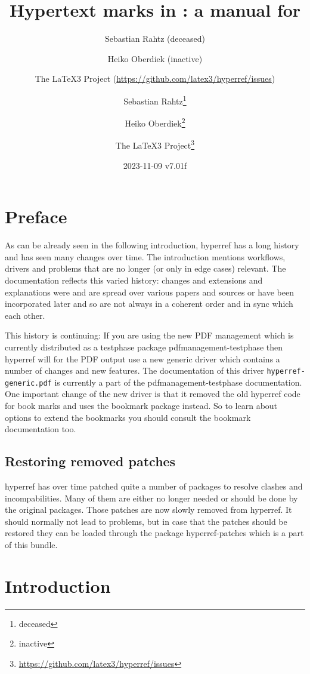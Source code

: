 \documentclass{article}
\author{Sebastian Rahtz (deceased)\and
       Heiko Oberdiek (inactive)\and
       The \LaTeX3 Project (\url{https://github.com/latex3/hyperref/issues})}
\author{Sebastian Rahtz\thanks{deceased}\and
       Heiko Oberdiek\thanks{inactive}\and
       The \LaTeX3 Project\thanks{\url{https://github.com/latex3/hyperref/issues}}}
\title{Hypertext marks in \hologo{LaTeX}: a manual for \xpackage{hyperref}}
\date{2023-11-09 v7.01f}
\newcommand*{\xpackage}[1]{\textsf{#1}}
\begin{document}
\thispagestyle{empty}
\maketitle
\tableofcontents
\setcounter{tocdepth}{2}%

\section{Preface}
As can be already seen in the following introduction, \xpackage{hyperref}
has a long history and has seen many changes over time. The introduction
mentions workflows, drivers and problems that are no longer (or only in edge cases) relevant.
The documentation reflects this varied history: changes
and extensions and explanations were and are spread over various papers and sources or
have been incorporated later and so are not always in a coherent order and in sync which each other.

This history is continuing: If you are using the new  PDF management
which is currently distributed as a testphase package \xpackage{pdfmanagement-testphase}
then \xpackage{hyperref} will for the PDF output use a new generic driver which
contains a number of changes and new features. The documentation of this driver
\texttt{hyperref-generic.pdf}
is currently a part of the \xpackage{pdfmanagement-testphase} documentation.
One important change of the new driver is
that it removed the old \xpackage{hyperref} code for book marks and uses
the \xpackage{bookmark} package instead. So to learn
about options to extend the bookmarks you should consult the \xpackage{bookmark} documentation
too.

\subsection{Restoring removed patches}

\xpackage{hyperref} has over time patched quite a number of packages to resolve clashes and incompabilities.
Many of them are either no longer needed or should be done by the original packages.
Those patches are now slowly removed from \xpackage{hyperref}.  It should normally not lead to problems, but
in case that the patches should be restored they can be loaded through the package \xpackage{hyperref-patches} which
is a part of this bundle.



\section{Introduction}
\end{document}
